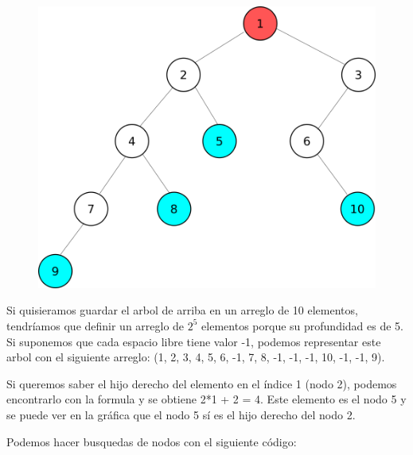 \documentclass{article}
\begin{document}
\begin{figure}[H]
    \centering
    \includegraphics[width=0.3\paperwidth]{arbolbinario}
\end{figure}

Si quisieramos guardar el arbol de arriba en un arreglo de 10 elementos, tendríamos que definir un arreglo de $2^5$ elementos porque su profundidad es de 5. Si suponemos que cada espacio libre tiene valor -1, podemos representar este arbol con el siguiente arreglo: (1, 2, 3, 4, 5, 6, -1, 7, 8, -1, -1, -1, 10, -1, -1, 9).

Si queremos saber el hijo derecho del elemento en el índice 1 (nodo 2), podemos encontrarlo con la formula y se obtiene 2*1 + 2 = 4. Este elemento es el nodo 5 y se puede ver en la gráfica que el nodo 5 sí es el hijo derecho del nodo 2.

Podemos hacer busquedas de nodos con el siguiente código:
\end{document}
